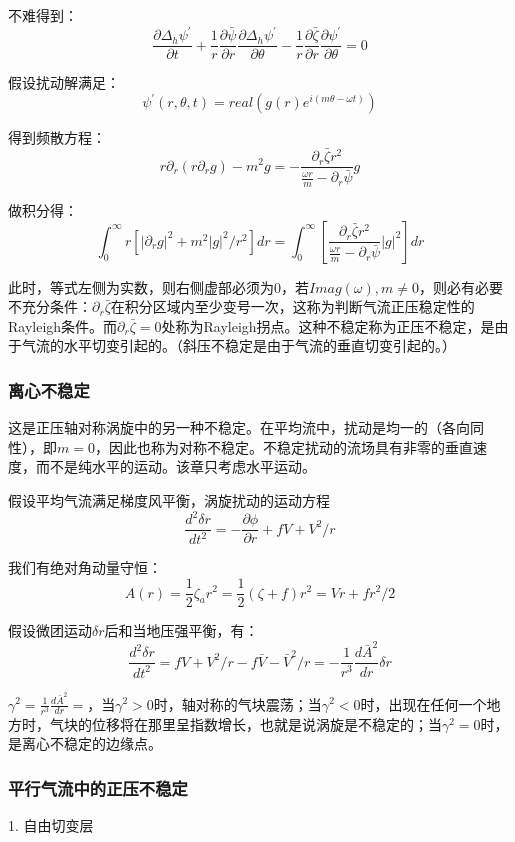 \documentclass{article}
\begin{document}
不难得到：
$$\frac{\partial\Delta_h\psi^{\prime}}{\partial t} + \frac{1}{r}\frac{\partial\bar{\psi}}{\partial r}\frac{\partial\Delta_h\psi^{\prime}}{\partial\theta} - \frac{1}{r}\frac{\partial\bar{\zeta}}{\partial r}\frac{\partial\psi^{\prime}}{\partial\theta} = 0$$

假设扰动解满足：
$$\psi^{\prime}(r,\theta,t)=real\left(g(r)e^{i(m\theta-\omega t)}\right)$$

得到频散方程：
$$r\partial_r(r\partial_r g)-m^2g=-\frac{\partial_r\bar{\zeta}r^2}{\frac{\omega r}{m}-\partial_r\bar{\psi}}g$$

做积分得：
$$\int_0^{\infty}r\left[|\partial_r g|^2 + m^2|g|^2/r^2\right]dr=\int_0^\infty\left[\frac{\partial_r\bar{\zeta}r^2}{\frac{\omega r}{m}-\partial_r\bar{\psi}}|g|^2\right]dr$$

此时，等式左侧为实数，则右侧虚部必须为$0$，若$Imag(\omega),m\ne0$，则必有必要不充分条件：$\partial_r\bar{\zeta}$在积分区域内至少变号一次，这称为判断气流正压稳定性的Rayleigh条件。而$\partial_r\bar{\zeta}=0$处称为Rayleigh拐点。这种不稳定称为正压不稳定，是由于气流的水平切变引起的。（斜压不稳定是由于气流的垂直切变引起的。）


\subsubsection{离心不稳定}
这是正压轴对称涡旋中的另一种不稳定。在平均流中，扰动是均一的（各向同性），即$m=0$，因此也称为对称不稳定。不稳定扰动的流场具有非零的垂直速度，而不是纯水平的运动。该章只考虑水平运动。

假设平均气流满足梯度风平衡，涡旋扰动的运动方程
$$\frac{d^2\delta r}{dt^2} = -\frac{\partial \phi}{\partial r} + fV + V^2/r$$

我们有绝对角动量守恒：
$$A(r) = \frac{1}{2}\zeta_a r^2 = \frac{1}{2}(\zeta + f)r^2=Vr+fr^2/2$$

假设微团运动$\delta r$后和当地压强平衡，有：
$$\frac{d^2\delta r}{dt^2} = fV + V^2/r - f\bar{V} - \bar{V}^2/r
=-\frac{1}{r^3}\frac{d\bar{A}^2}{dr}\delta r$$

$\gamma^2=\frac{1}{r^3}\frac{d\bar{A}^2}{dr}=$，当$\gamma^2>0$时，轴对称的气块震荡；当$\gamma^2<0$时，出现在任何一个地方时，气块的位移将在那里呈指数增长，也就是说涡旋是不稳定的；当$\gamma^2=0$时，是离心不稳定的边缘点。


\subsubsection{平行气流中的正压不稳定}
1. 自由切变层
\end{document}
